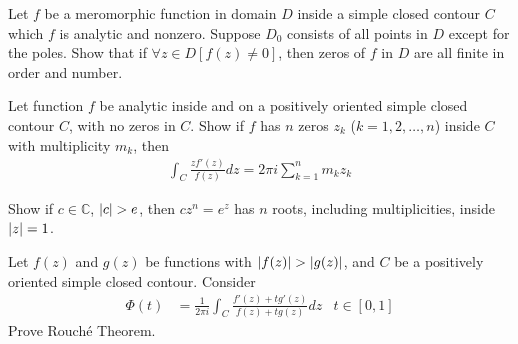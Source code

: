 \documentclass[12pt, english]{book}
\makeatletter
\renewenvironment{proof}[1][\proofname]{\par
	\pushQED{\qed}%
	\normalfont \topsep6\p@\@plus6\p@\relax
	\list{}{%
		\settowidth{\leftmargin}{\itshape\proofname:\hskip\labelsep}%
		\setlength{\labelwidth}{0pt}%
		\setlength{\itemindent}{-\leftmargin}%
	}%
	\item[\hskip\labelsep\itshape#1\@addpunct{:}]\ignorespaces
}{%
	\popQED\endlist\@endpefalse
}
\makeatother
\begin{document}
	\begin{example}
		\label{Function not identically zero in domain implies zeros of function finite in order and number Example - Complex}
		Let \(f\) be a meromorphic function in domain \(D\) inside a simple closed contour \(C\) which \(f\) is analytic and nonzero. Suppose \(D_0\) consists of all points in \(D\) except for the poles. Show that if \(\forall z \in D[f(z) \neq 0]\), then zeros of \(f\) in \(D\) are all finite in order and number.
		\begin{proof}
			{\color{Grey}
				
			}
		\end{proof}
	\end{example}
	
	\begin{example}
		Let function \(f\) be analytic inside and on a positively oriented simple closed contour \(C\), with no zeros in \(C\). Show if \(f\) has \(n\) zeros \(z_k\) (\(k = 1, 2, \ldots, n\)) inside \(C\) with multiplicity \(m_k\), then
		\begin{align*}
			\int_{C} \frac{zf'(z)}{f(z)} dz = 2 \pi i \sum_{k=1}^{n} m_k z_k
		\end{align*}
		\begin{proof}
			{\color{Grey}
				
			}
		\end{proof}
	\end{example}

	\begin{example}
		Show if \(c \in \mathbb{C}\), \(\abs{c}>e\), then \(cz^n = e^z\) has \(n\) roots, including multiplicities, inside \(\abs{z} = 1\).
		\begin{proof}
			{\color{Grey}
				
			}
		\end{proof}
	\end{example}

	\begin{example}
		\label{Rouche's Theorem Alternate Proof - Complex}
		Let \(f(z)\) and \(g(z)\) be functions with \(\abs{f(z)} > \abs{g(z)}\), and \(C\) be a positively oriented simple closed contour. Consider 
		\begin{align*}
			\Phi(t) &= \frac{1}{2\pi i} \int_{C} \frac{f'(z) + t g'(z)}{f(z) + tg(z)} dz
				& t \in [0, 1]
		\end{align*}
		Prove Rouché Theorem.
		\begin{proof}
			{\color{Grey}
				
			}
		\end{proof}
	\end{example}
\end{document}
